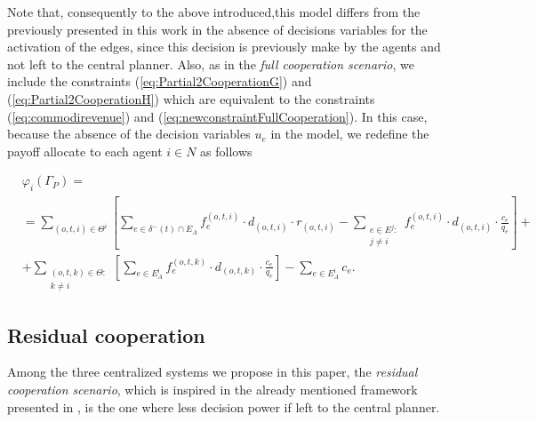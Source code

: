 \documentclass[review]{elsarticle}
\begin{document}
Note that, consequently to the above introduced,this model differs from the previously presented in this work in the absence of decisions variables for the activation of the edges, since this decision is previously make by the agents and not left to the central planner. Also, as in the \emph{full cooperation scenario}, we include the constraints (\ref{eq:Partial2CooperationG}) and (\ref{eq:Partial2CooperationH})
which are equivalent to the constraints (\ref{eq:commodirevenue}) and (\ref{eq:newconstraintFullCooperation}). In this case, because the absence of the decision variables $u_e$ in the model, we redefine the payoff allocate to each agent $i\in N$ as follows

\begin{equation}
    \begin{split}
    & \varphi_i(\Gamma_P) =\label{eq:PartialCooperationPayoff} \\
    & = \sum_{(o,t,i)\in \Theta^i} \left[ \sum_{e \in \delta^-(t)\cap E_A} f_e^{(o,t,i)} \cdot d_{(o,t,i)} \cdot r_{(o,t,i)} -  \sum_{\substack{e\in E^j \colon\\ j\not = i}} f_e^{(o,t,i)} \cdot d_{(o,t,i)} \cdot \frac{c_e}{q_e} \right] + \\
    & + \sum_{\substack{(o,t,k) \in \Theta  \colon \\ k \not = i}} \left[\sum_{e \in E_A^i} f_e^{(o,t,k)} \cdot d_{(o,t,k)} \cdot \frac{c_e}{q_e}\right] - \sum_{e \in E_A^i} c_e.
    \end{split}
\end{equation}

\subsection{Residual cooperation}

Among the three centralized systems we propose in this paper, the
\emph{residual cooperation scenario}, which is inspired in the already mentioned framework presented in \cite{ANUPINDI2001}, is the one where less decision power if left to the central planner.
\end{document}
